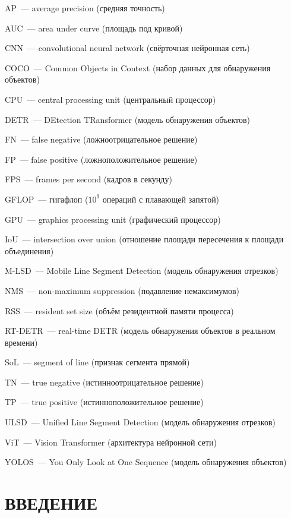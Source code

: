 \documentclass[a4paper,12pt]{extreport}
\newcommand{\structel}[1]{%
  \clearpage\phantomsection\addcontentsline{toc}{chapter}{\MakeUppercase{#1}}%
  \chapter*{\MakeUppercase{#1}}}
\begin{document}
\noindent AP~--- average precision (средняя точность)\par
\noindent AUC~--- area under curve (площадь под кривой)\par
\noindent CNN~--- convolutional neural network (свёрточная нейронная сеть)\par
\noindent COCO~--- Common Objects in Context (набор данных для обнаружения объектов)\par
\noindent CPU~--- central processing unit (центральный процессор)\par
\noindent DETR~--- DEtection TRansformer (модель обнаружения объектов)\par
\noindent FN~--- false negative (ложноотрицательное решение)\par
\noindent FP~--- false positive (ложноположительное решение)\par
\noindent FPS~--- frames per second (кадров в секунду)\par
\noindent GFLOP~--- гигафлоп ($10^9$ операций с плавающей запятой)\par
\noindent GPU~--- graphics processing unit (графический процессор)\par
\noindent IoU~--- intersection over union (отношение площади пересечения к площади объединения)\par
\noindent M-LSD~--- Mobile Line Segment Detection (модель обнаружения отрезков)\par
\noindent NMS~--- non-maximum suppression (подавление немаксимумов)\par
\noindent RSS~--- resident set size (объём резидентной памяти процесса)\par
\noindent RT-DETR~--- real-time DETR (модель обнаружения объектов в реальном времени)\par
\noindent SoL~--- segment of line (признак сегмента прямой)\par
\noindent TN~--- true negative (истинноотрицательное решение)\par
\noindent TP~--- true positive (истинноположительное решение)\par
\noindent ULSD~--- Unified Line Segment Detection (модель обнаружения отрезков)\par
\noindent ViT~--- Vision Transformer (архитектура нейронной сети)\par
\noindent YOLOS~--- You Only Look at One Sequence (модель обнаружения объектов)\par

\structel{ВВЕДЕНИЕ}
\end{document}
